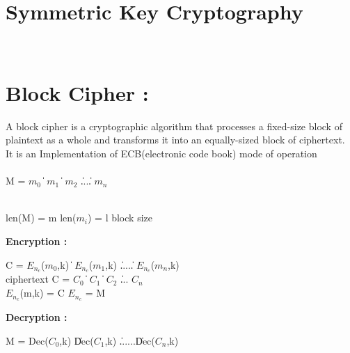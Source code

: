 \documentclass[11pt]{article}
\begin{document}
\section{Symmetric Key Cryptography}

\\

\section{Block Cipher :}
A block cipher is a cryptographic algorithm that processes a fixed-size block of plaintext as a whole
and transforms it into an equally-sized block of ciphertext.\\
It is an Implementation of ECB(electronic code book) mode of operation \\

\\ M = $m_0$ \| $m_1$ \| $m_2$ \|....\| $m_n$  

\\ len(M) = m \quad len($m_i$) = l \hookleftarrow block size \\

\item \textbf{Encryption :}

C = $E_n_c$($m_0$,k) \| $E_n_c$($m_1$,k) \|.....\| $E_n_c$($m_n$,k) \\

ciphertext C = $C_0$ \|  $C_1$ \|  $C_2$ \|... $C_n$ \\ 

$E_n_c$(m,k) = C  \quad  $E_n_c$ = M\timesK \\

\item \textbf{Decryption :}

M = Dec($C_0$,k) \| Dec($C_1$,k) \|......\| Dec($C_n$,k) \\ 
\end{document}
